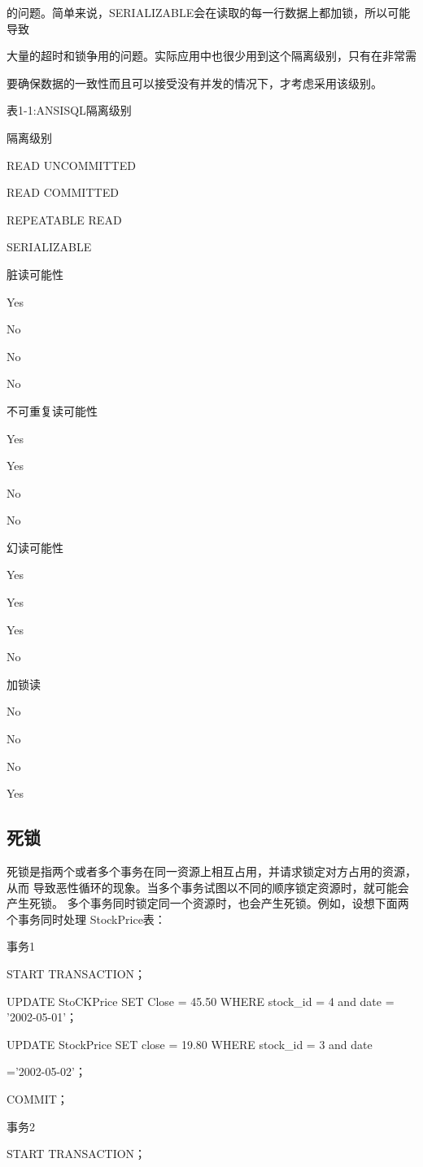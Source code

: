 的问题。简单来说，SERIALIZABLE会在读取的每一行数据上都加锁，所以可能导致

大量的超时和锁争用的问题。实际应用中也很少用到这个隔离级别，只有在非常需

要确保数据的一致性而且可以接受没有并发的情况下，才考虑采用该级别。

表1-1:ANSISQL隔离级别

隔离级别

READ UNCOMMITTED

READ COMMITTED

REPEATABLE READ

SERIALIZABLE

脏读可能性

Yes

No

No

No

不可重复读可能性

Yes

Yes

No

No

幻读可能性

Yes

Yes

Yes

No

加锁读

No

No

No

Yes

\subsection{死锁}
死锁是指两个或者多个事务在同一资源上相互占用，并请求锁定对方占用的资源，从而
导致恶性循环的现象。当多个事务试图以不同的顺序锁定资源时，就可能会产生死锁。
多个事务同时锁定同一个资源时，也会产生死锁。例如，设想下面两个事务同时处理
StockPrice表：

事务1

START TRANSACTION；

UPDATE StoCKPrice SET Close = 45.50 WHERE stock\_id = 4 and date = '2002-05-01'；

UPDATE StockPrice SET close = 19.80 WHERE stock\_id = 3 and date

='2002-05-02'；

COMMIT；

事务2

START TRANSACTION；

